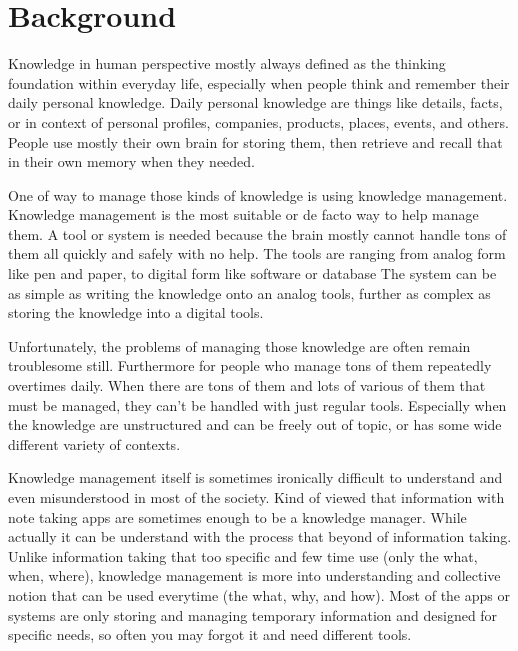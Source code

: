 \section{Background}
\label{sec:background}

Knowledge in human perspective mostly always defined as the thinking foundation within everyday life,
especially when people think and remember their daily personal knowledge.
Daily personal knowledge are things like details, facts, or in context of personal profiles, companies, products, places, events, and others.
People use mostly their own brain for storing them, then retrieve and recall that in their own memory when they needed.

One of way to manage those kinds of knowledge is using knowledge management.
Knowledge management is the most suitable or de facto way to help manage them.
A tool or system is needed because the brain mostly cannot handle tons of them all quickly and safely with no help.
The tools are ranging from analog form like pen and paper, to digital form like software or database
The system can be as simple as writing the knowledge onto an analog tools, further as complex as storing the knowledge into a digital tools.

Unfortunately, the problems of managing those knowledge are often remain troublesome still.
Furthermore for people who manage tons of them repeatedly overtimes daily.
When there are tons of them and lots of various of them that must be managed, they can’t be handled with just regular tools.
Especially when the knowledge are unstructured and can be freely out of topic, or has some wide different variety of contexts.

Knowledge management itself is sometimes ironically difficult to understand and even misunderstood in most of the society.
Kind of viewed that information with note taking apps are sometimes enough to be a knowledge manager.
While actually it can be understand with the process that beyond of information taking.
Unlike information taking that too specific and few time use (only the what, when, where), knowledge management is more into understanding and collective notion that can be used everytime (the what, why, and how).
Most of the apps or systems are only storing and managing temporary information and designed for specific needs, so often you may forgot it and need different tools.

